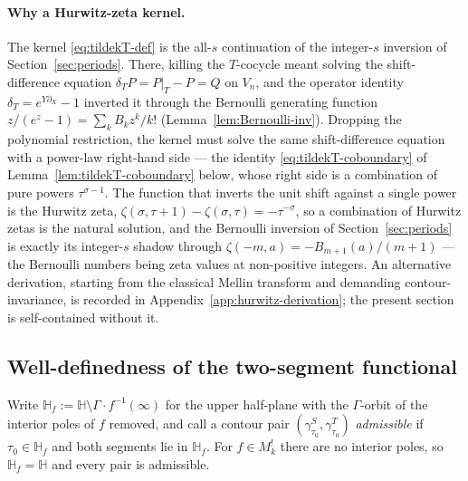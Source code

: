 \documentclass[11pt]{article}
\numberwithin{equation}{section}  %
\newcommand{\HH}{\mathbb{H}}
\begin{document}
\paragraph{Why a Hurwitz-zeta kernel.}
The kernel \eqref{eq:tildekT-def} is the all-$s$ continuation of the
integer-$s$ inversion of Section~\ref{sec:periods}.  There, killing the
$T$-cocycle meant solving the shift-difference equation
$\delta_T P = P|_T - P = Q$ on $V_n$, and the operator identity
$\delta_T = e^{Y\partial_X} - 1$ inverted it through the Bernoulli
generating function $z/(e^z - 1) = \sum_k B_k z^k/k!$
(Lemma~\ref{lem:Bernoulli-inv}).  Dropping the polynomial restriction,
the kernel must solve the same shift-difference equation with a
power-law right-hand side --- the identity
\eqref{eq:tildekT-coboundary} of
Lemma~\ref{lem:tildekT-coboundary} below, whose right side is a
combination of pure powers $\tau^{\sigma - 1}$.  The function that
inverts the unit shift against a single power is the Hurwitz zeta,
$\zeta(\sigma, \tau + 1) - \zeta(\sigma, \tau) = -\tau^{-\sigma}$, so a
combination of Hurwitz zetas is the natural solution, and the
Bernoulli inversion of Section~\ref{sec:periods} is exactly its integer-$s$
shadow through $\zeta(-m, a) = -B_{m+1}(a)/(m+1)$ --- the Bernoulli
numbers being zeta values at non-positive integers.  An alternative
derivation, starting from the classical Mellin transform and demanding
contour-invariance, is recorded in
Appendix~\ref{app:hurwitz-derivation}; the present section is
self-contained without it.

\subsection{Well-definedness of the two-segment functional}\label{subsec:well-defined}

Write $\HH_f := \HH \setminus \Gamma\!\cdot\! f^{-1}(\infty)$ for the
upper half-plane with the $\Gamma$-orbit of the interior poles of $f$
removed, and call a contour pair
$(\gamma^S_{\tau_0}, \gamma^T_{\tau_0})$ \emph{admissible} if
$\tau_0 \in \HH_f$ and both segments lie in $\HH_f$.  For
$f \in M^!_k$ there are no interior poles, so $\HH_f = \HH$ and every
pair is admissible.
\end{document}
